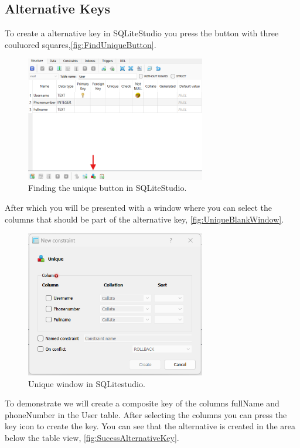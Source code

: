 \documentclass[a4paper,11pt,oneside]{article}
\begin{document}
\begin{sloppypar}
\subsection{Alternative Keys}
\label{sqliteStudioAlternativeKeys}
To create a alternative key in SQLiteStudio you press the button with three couluored squares,\autoref{fig:FindUniqueButton}. 
\begin{figure}[!htb]
  \centering
  \includegraphics[width=0.7\textwidth]{sqlitestudio/alternative_key/unique_symbol_square.png}
  \caption{Finding the unique button in SQLiteStudio.}
  \label{fig:FindUniqueButton}
\end{figure}
After which you will be presented with a window where you can select the columns that should be part of the alternative key, \autoref{fig:UniqueBlankWindow}.
\begin{figure}[!htb]
  \centering
  \includegraphics[width=0.7\textwidth]{sqlitestudio/alternative_key/alternative_key_blank.png}
  \caption{Unique window in SQLitestudio.}
  \label{fig:UniqueBlankWindow}
\end{figure}
To demonstrate we will create a composite key of the columns fullName and phoneNumber in the User table. After selecting the columns you can press the key icon to create the key. You can see that the alternative is created in the area below the table view, \autoref{fig:SucessAlternativeKey}.

\end{sloppypar}
\end{document}
